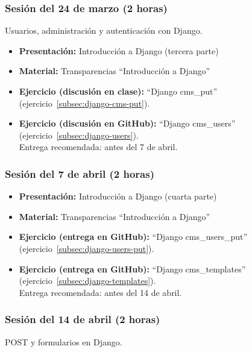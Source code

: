 \documentclass[a4paper,12pt]{article}
\begin{document}
\subsubsection{Sesión del 24 de marzo (2 horas)}

Usuarios, administración y autenticación con Django.

\begin{itemize}
 \item \textbf{Presentación:} Introducción a Django (tercera parte)
 \item \textbf{Material:} Transparencias ``Introducción a Django''
  \item \textbf{Ejercicio (discusión en clase):} ``Django cms\_put'' (ejercicio~\ref{subsec:django-cms-put}).
 \item \textbf{Ejercicio (discusión en GitHub):} ``Django cms\_users'' (ejercicio~\ref{subsec:django-users}). \\
 Entrega recomendada: antes del 7 de abril.
\end{itemize}


\subsubsection{Sesión del 7 de abril (2 horas)}

\begin{itemize}
 \item \textbf{Presentación:} Introducción a Django (cuarta parte)
 \item \textbf{Material:} Transparencias ``Introducción a Django''
 \item \textbf{Ejercicio (entrega en GitHub):} ``Django cms\_users\_put'' (ejercicio~\ref{subsec:django-users-put}).
 \item \textbf{Ejercicio (entrega en GitHub):} ``Django cms\_templates'' (ejercicio~\ref{subsec:django-templates}). \\
  Entrega recomendada: antes del 14 de abril.
\end{itemize}


\subsubsection{Sesión del 14 de abril (2 horas)}

POST y formularios en Django.
\end{document}
